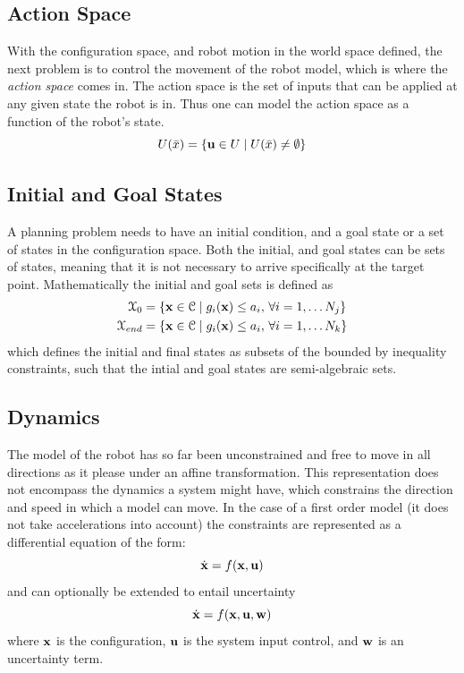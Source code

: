 \subsection{Action Space}

With the configuration space, and robot motion in the world space defined, the
next problem is to control the movement of the robot model, which is where the
\textit{action space} comes in. The action space is the set of inputs that can
be applied at any given state the robot is in. Thus one can model the action
space as a function of the robot's state.
\[
  U(\bar{x}) = \lbrace\mathbf{u} \in U \mid
    U(\bar{x}) \neq \emptyset \rbrace
\]

\subsection{Initial and Goal States}

A planning problem needs to have an initial condition, and a goal state or a set
of states in the configuration space. Both the initial, and goal states can be
sets of states, meaning that it is not necessary to arrive specifically at the
target point. Mathematically the initial and goal sets is defined as
\begin{align*}
  \mathcal{X}_0 &= \lbrace \mathbf{x} \in \mathcal{C}{} \mid g_i(\mathbf{x}) \leq a_i,
                  \, \forall i = 1,\ldots N_j\rbrace \\
  \mathcal{X}_{end} &= \lbrace \mathbf{x} \in \mathcal{C}{} \mid g_i(\mathbf{x}) \leq
                      a_i, \, \forall i = 1,\ldots N_k\rbrace
\end{align*}
which defines the initial and final states as subsets of the
\modelconfigurationspace{} bounded by inequality constraints, such that the
intial and goal states are semi-algebraic sets.

\subsection{Dynamics}

The model of the robot has so far been unconstrained and free to move in all
directions as it please under an affine transformation. This representation does
not encompass the dynamics a system might have, which constrains the direction
and speed in which a model can move. In the case of a first order model (\ie it
does not take accelerations into account) the constraints are represented as a
differential equation of the form:
\[
  \dot{\mathbf{x}} = f(\mathbf{x},\mathbf{u})
\]
and can optionally be extended to entail uncertainty
\[
  \dot{\mathbf{x}} = f(\mathbf{x},\mathbf{u},\mathbf{w})
\]
where \(\mathbf{x}\) is the configuration, \(\mathbf{u}\) is the system input
control, and \(\mathbf{w}\) is an uncertainty term.

